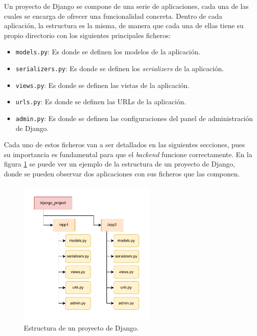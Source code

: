 Un proyecto de Django se compone de una serie de aplicaciones, cada una de las cuales se encarga de ofrecer una funcionalidad concreta. Dentro de cada aplicación, la estructura es la misma, de manera que cada una de ellas tiene su propio directorio con los siguientes principales ficheros:

\begin{itemize}
    \item \texttt{models.py}: Es donde se definen los modelos de la aplicación.
    \item \texttt{serializers.py}: Es donde se definen los \textit{serializers} de la aplicación.
    \item \texttt{views.py}: Es donde se definen las vistas de la aplicación.
    \item \texttt{urls.py}: Es donde se definen las URLs de la aplicación.
    \item \texttt{admin.py}: Es donde se definen las configuraciones del panel de administración de Django.
\end{itemize}

Cada uno de estos ficheros van a ser detallados en las siguientes secciones, pues su importancia es fundamental para que el \textit{backend} funcione correctamente. En la figura \ref{dev:fig:estructura_django} se puede ver un ejemplo de la estructura de un proyecto de Django, donde se pueden observar dos aplicaciones con sus ficheros que las componen.

\begin{figure}[H]
    \centering
    \includegraphics[width=0.6\textwidth]{figures/design_develop/estructura_django.pdf}
    \caption{Estructura de un proyecto de Django.}
    \label{dev:fig:estructura_django}
\end{figure}


